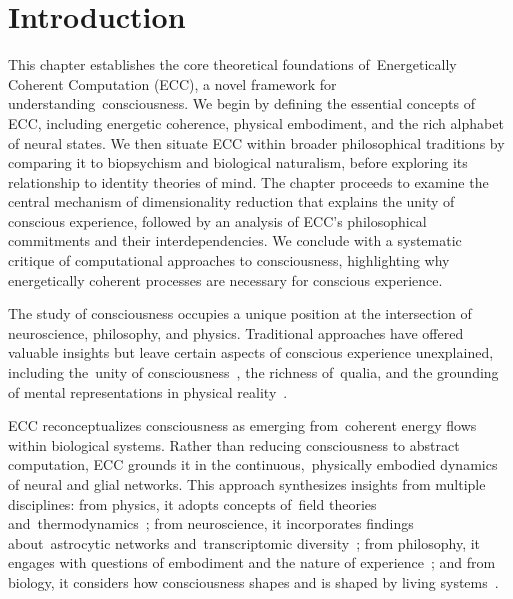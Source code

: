 \section{Introduction}

This chapter establishes the core theoretical foundations of~Energetically Coherent Computation (ECC), a novel framework for understanding~consciousness. We begin by defining the essential concepts of ECC, including energetic coherence, physical embodiment, and the rich alphabet of neural states. We then situate ECC within broader philosophical traditions by comparing it to biopsychism and biological naturalism, before exploring its relationship to identity theories of mind. The chapter proceeds to examine the central mechanism of dimensionality reduction that explains the unity of conscious experience, followed by an analysis of ECC's philosophical commitments and their interdependencies. We conclude with a systematic critique of computational approaches to consciousness, highlighting why energetically coherent processes are necessary for conscious experience.

The study of consciousness occupies a unique position at the intersection of neuroscience, philosophy, and physics. Traditional approaches have offered valuable insights but leave certain aspects of conscious experience unexplained, including the~unity of consciousness~\cite{bayne2010unity}, the richness of~qualia, and the grounding of mental representations in physical reality~\cite{block1995confusion}.


ECC reconceptualizes consciousness as emerging from~coherent energy flows within biological systems. Rather than reducing consciousness to abstract computation, ECC grounds it in the continuous,~physically embodied dynamics of neural and glial networks. This approach synthesizes insights from multiple disciplines: from physics, it adopts concepts of~field theories and~thermodynamics~\cite{prigogine2018order,hameroff2014consciousness,McFadden2020}; from neuroscience, it incorporates findings about~astrocytic networks and~transcriptomic diversity~\cite{Giaume2010,pinotsis2023cytoelectric,Hawrylycz2012}; from philosophy, it engages with questions of embodiment and the nature of experience~\cite{varela1991embodied,clark2013whatever}; and from biology, it considers how consciousness shapes and is shaped by living systems~\cite{maturana1991autopoiesis}.

